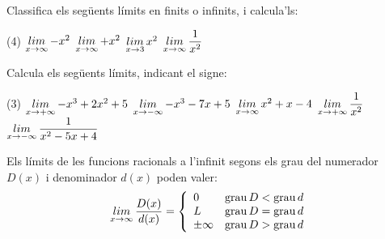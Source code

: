 \begin{mylist}
	
		\exer \mental Classifica els següents límits en finits o infinits, i calcula'ls:
	\begin{tasks}(4) 
		\task  $\mathop{lim}\limits_{x\to \infty } -x^{2} $  \task  $\mathop{lim}\limits_{x\to \infty } +x^{2} $   \task  $\mathop{lim}\limits_{x\to 3} x^{2} $  \task  $\mathop{lim}\limits_{x\to \infty } \dfrac{1}{x^{2} } $
	\end{tasks}

	\exer  Calcula els següents límits, indicant el signe:
	\begin{tasks}(3) 
		\task  $\mathop{lim}\limits_{x\to +\infty } -x^{3}+2x^2+5 $ \task  $\mathop{lim}\limits_{x\to -\infty } -x^{3}-7x+5 $   \task  $\mathop{lim}\limits_{x\to \infty } x^{2}+x-4 $ \task  $\mathop{lim}\limits_{x\to +\infty } \dfrac{1}{x^{2} } $   \task  $\mathop{lim}\limits_{x\to -\infty } \dfrac{1}{x^{2} - 5x + 4 } $
	\end{tasks}

\end{mylist}

\begin{theorybox}
	Els límits de les funcions racionals a l'infinit segons els grau del numerador $D(x)$ i denominador $d(x)$  poden valer: 
	\begin{equation*}
	\mathop{lim}\limits_{x\to \infty} \dfrac{D(x)}{d(x)} = \left\{ \begin{array}{ll} 0 & \mathrm{grau}\, D < \mathrm{grau}\, d \\ L & \mathrm{grau}\, D = \mathrm{grau}\, d \\ \pm\infty & \mathrm{grau}\, D > \mathrm{grau}\, d \end{array} \right.
\end{equation*}
\end{theorybox}

